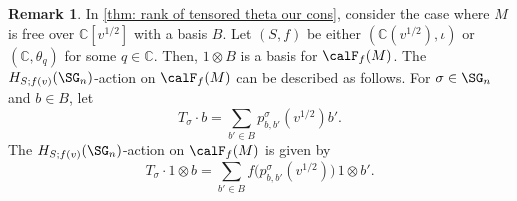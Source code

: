 \documentclass[12pt, reqno]{amsart}
\theoremstyle{plain}
\theoremstyle{definition}
\newtheorem{remark}[remark]{Remark}
\numberwithin{equation}{section}
\numberwithin{figure}{section}
\numberwithin{table}{section}
\def\C{\mathbb C}
\begin{document}
\begin{remark}\label{rem: poly action and hecke action under free cond}
In \cref{thm: rank of tensored theta our cons}, consider the case where $M$ is free over $\C[v^{1/2}]$ with a basis $B$.
Let $(S,f)$ be either $(\C(v^{1/2}), \iota)$ or $(\C, \theta_q)$ for some $q \in \C$.
Then,  
$1 \otimes B$ is a basis for $\calF_f(M)$.
The $H_{S;f(v)}(\SG_n)$-action on $\calF_f(M)$ can be described as follows.
For $\sigma \in \SG_n$ and $b \in B$, let 
\begin{equation*}
T_\sigma \cdot b = \sum_{b' \in B}p^{\sigma}_{b, b'}(v^{1/2}) b'.
\end{equation*}
The $H_{S;f(v)}(\SG_n)$-action on $\calF_f(M)$ is given by 
\begin{equation}\label{eq: specialization and module action}
T_\sigma \cdot 1 \otimes b = \sum_{b' \in B} f\big(p^{\sigma}_{b, b'}(v^{1/2})\big)\, 1 \otimes b'.
\end{equation}
\end{remark}
\end{document}
